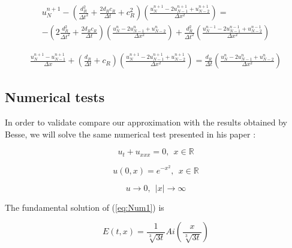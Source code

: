 \begin{equation}
	\begin{aligned}
    u_N^{n+1} - \left( \frac{d_R^2}{\Delta t^2} + \frac{2d_Rc_R}{\Delta t} + c_R^2  \right) \left(  \frac{u_{N}^{n+1} - 2u_{N-1}^{n+1} + u_{N-2}^{n+1}}{\Delta x^2} \right) = \\
     -\left( 2\frac{d_R^2}{\Delta t^2} + \frac{2d_Rc_R}{\Delta t}\right) \left(  \frac{u_N^{n} - 2u_{N-1}^n + u_{N-2}^{n}}{\Delta x^2} \right) + \frac{d_R^2}{\Delta t^2} \left(  \frac{u_N^{n-1} - 2u_{N-1}^{n-1} + u_{N-2}^{n-1}}{\Delta x^2} \right)
    \end{aligned}
\end{equation} 
   
\begin{equation}
	\begin{aligned}	
    \frac{u_N^{n+1} - u_{N-1}^{n+1}}{\Delta x} + \left( \frac{d_R}{\Delta t} + c_R \right) \left( \frac{u_N^{n+1} -2 u_{N-1}^{n+1} + u_{N-2}^{n+1}}{\Delta x^2}\right) =      \frac{d_R}{\Delta t}\left( \frac{u_{N}^{n} - 2u_{N-1}^{n} + u_{N-2}^n}{\Delta x^2}\right)
    \end{aligned}
\end{equation}

\normalsize

\subsection{Numerical tests}

\indent In order to validate compare our approximation with the results obtained by Besse, we will solve the same numerical test presented in his paper : 

\begin{equation}
\label{eq:Num1}
 u_t + u_{xxx} = 0, \ \ x \in \mathbb{R}
\end{equation}

\begin{equation}
\label{eq:Num2}
 u(0,x) = e^{-x^2}, \ \ x \in \mathbb{R} 
\end{equation}

\begin{equation}
\label{eq:Num3}
 u \rightarrow 0, \ \ |x| \rightarrow \infty
\end{equation}

\indent The fundamental solution of (\ref{eq:Num1}) is

\begin{equation}
    E(t,x) = \frac{1}{\sqrt[3]{3t}}Ai\left(\frac{x}{\sqrt[3]{3t}} \right)
\end{equation}

